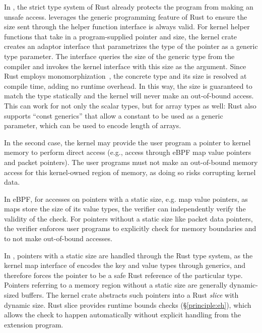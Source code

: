 In \projname{}, the strict type system of Rust already protects the program
    from making an unsafe access.
\projname{} leverages the generic programming feature of Rust to ensure the
    size sent through the helper function interface is always valid.
For kernel helper functions that take in a
    program-supplied pointer and size, the \projname{} kernel crate creates an
    adaptor interface that parametrizes the type of the pointer as a generic
    type parameter.
The interface queries the size of the generic type from the compiler
    and invokes the kernel interface with this size as the argument.
Since Rust employs monomorphization~\cite{rustc-monomorphize}, the concrete
    type and its size is resolved at compile time, adding no runtime overhead.
In this way, the size is guaranteed to match the type statically and the
    kernel will never make an out-of-bound access.
This can work for not only the scalar types, but for array types as well: Rust
    also supports ``const generics'' that allow a constant to be used as a
    generic parameter, which can be used to encode length of arrays.

In the second case, the kernel may provide the user program a pointer to
    kernel memory to perform direct access (e.g., access through eBPF map value
    pointers and packet pointers).
The user programs must not make an out-of-bound memory access for this
    kernel-owned region of memory, as doing so risks corrupting kernel data.

In eBPF, for accesses on pointers with a static size, e.g. map value pointers,
    as maps store the size of its value types, the verifier can independently
    verify the validity of the check.
For pointers without a static size like packet data pointers, the verifier
    enforces user programs to explicitly check for memory
    boundaries and to not make out-of-bound accesses.

In \projname{}, pointers with a static size are handled through the Rust type
    system, as the
    kernel map interface of \projname{} encodes the key and value types through
    generics, and therefore forces the pointer to be a safe Rust reference of
    the particular type.
Pointers referring to a memory region without a static size are generally
    dynamic-sized buffers.
The \projname{} kernel crate abstracts such pointers into a Rust \emph{slice}
    with dynamic size.
Rust slice provides runtime bounds checks (\S\ref{principle:eh}), which allows
    the check to happen automatically without explicit handling from the
    extension program.

